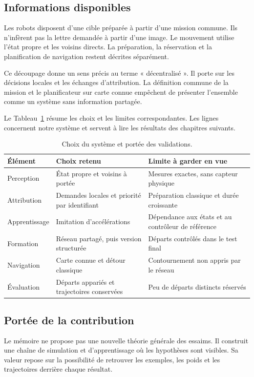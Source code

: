 \subsection{Informations disponibles}
Les robots disposent d'une cible préparée à partir d'une mission commune. Ils n'infèrent pas la lettre demandée à partir d'une image. Le mouvement utilise l'état propre et les voisins directs. La préparation, la réservation et la planification de navigation restent décrites séparément.

Ce découpage donne un sens précis au terme « décentralisé ». Il porte sur les décisions locales et les échanges d'attribution. La définition commune de la mission et le planificateur sur carte connue empêchent de présenter l'ensemble comme un système sans information partagée.

Le Tableau~\ref{tab:positionnement} résume les choix et les limites correspondantes. Les lignes concernent notre système et servent à lire les résultats des chapitres suivants.
\begin{table}[htbp]
\caption{Choix du système et portée des validations.}
\label{tab:positionnement}


\centering\small
\begin{tabularx}{\textwidth}{p{2.7cm}XX}
\toprule
Élément & Choix retenu & Limite à garder en vue\\\midrule
Perception & État propre et voisins à portée & Mesures exactes, sans capteur physique\\
Attribution & Demandes locales et priorité par identifiant & Préparation classique et durée croissante\\
Apprentissage & Imitation d'accélérations & Dépendance aux états et au contrôleur de référence\\
Formation & Réseau partagé, puis version structurée & Départs contrôlés dans le test final\\
Navigation & Carte connue et détour classique & Contournement non appris par le réseau\\
Évaluation & Départs appariés et trajectoires conservées & Peu de départs distincts réservés\\
\bottomrule
\end{tabularx}
\end{table}

\subsection{Portée de la contribution}
Le mémoire ne propose pas une nouvelle théorie générale des essaims. Il construit une chaîne de simulation et d'apprentissage où les hypothèses sont visibles. Sa valeur repose sur la possibilité de retrouver les exemples, les poids et les trajectoires derrière chaque résultat.

